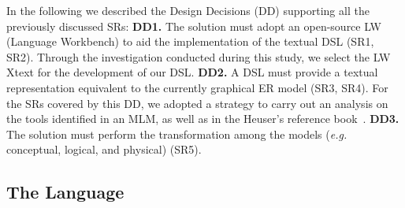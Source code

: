 \documentclass[a4paper,twoside,anonymous]{article}
\begin{document}

In the following we described the Design Decisions (DD) supporting all the previously discussed SRs:
%
    \textbf{DD1.} The solution must adopt an open-source LW (Language Workbench) to aid the implementation of the textual DSL (SR1, SR2).
    Through the investigation conducted during this study, we select the LW Xtext for the development of our DSL. %
    \textbf{DD2.} A DSL must provide a textual representation  equivalent to the currently graphical ER model (SR3, SR4).
    For the SRs covered by this DD, we adopted a strategy to carry out an analysis on the tools identified in an MLM,
    as well as in the Heuser's reference book~\cite{Heuser:2009}.
    \textbf{DD3.} The solution must perform the transformation among the models (\textit{e.g.} conceptual, logical, and physical) (SR5).

\subsection{The Language} \label{sec:EspecDSL}
\end{document}
